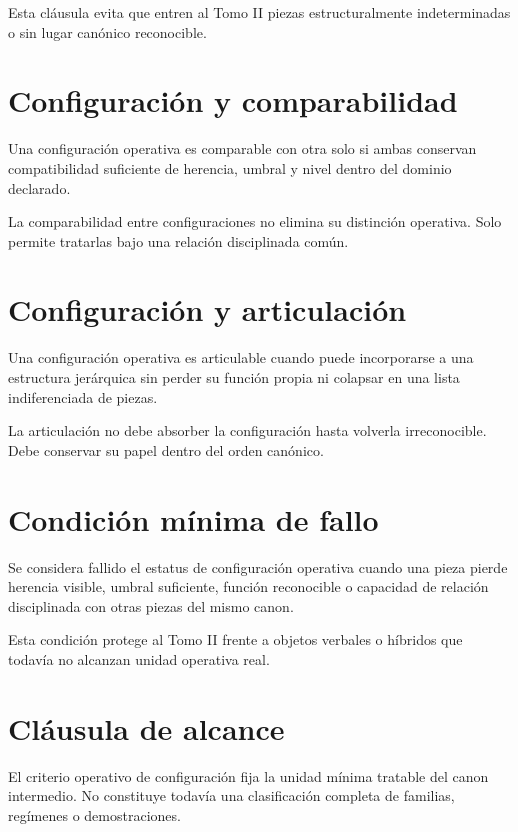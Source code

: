 \begin{observation}
Esta cláusula evita que entren al Tomo II piezas estructuralmente indeterminadas o sin lugar canónico reconocible.
\end{observation}

\section{Configuración y comparabilidad}
\begin{definition}
Una configuración operativa es comparable con otra solo si ambas conservan compatibilidad suficiente de herencia, umbral y nivel dentro del dominio declarado.
\end{definition}

\begin{observation}
La comparabilidad entre configuraciones no elimina su distinción operativa. Solo permite tratarlas bajo una relación disciplinada común.
\end{observation}

\section{Configuración y articulación}
\begin{definition}
Una configuración operativa es articulable cuando puede incorporarse a una estructura jerárquica sin perder su función propia ni colapsar en una lista indiferenciada de piezas.
\end{definition}

\begin{observation}
La articulación no debe absorber la configuración hasta volverla irreconocible. Debe conservar su papel dentro del orden canónico.
\end{observation}

\section{Condición mínima de fallo}
\begin{definition}
Se considera fallido el estatus de configuración operativa cuando una pieza pierde herencia visible, umbral suficiente, función reconocible o capacidad de relación disciplinada con otras piezas del mismo canon.
\end{definition}

\begin{observation}
Esta condición protege al Tomo II frente a objetos verbales o híbridos que todavía no alcanzan unidad operativa real.
\end{observation}

\section{Cláusula de alcance}
\begin{observation}
El criterio operativo de configuración fija la unidad mínima tratable del canon intermedio. No constituye todavía una clasificación completa de familias, regímenes o demostraciones.
\end{observation}


